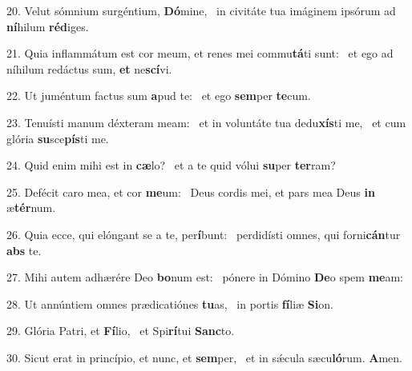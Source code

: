 20. Velut sómnium surgéntium, \textbf{Dó}mine, \ast\  in civitáte tua imáginem ipsórum ad \textbf{ní}hilum \textbf{réd}iges.\

21. Quia inflammátum est cor meum, et renes mei commu\textbf{tá}ti sunt: \ast\  et ego ad níhilum redáctus sum, \textbf{et} ne\textbf{scí}vi.\

22. Ut juméntum factus sum \textbf{a}pud te: \ast\  et ego \textbf{sem}per \textbf{te}cum.\

23. Tenuísti manum déxteram meam: \dag\  et in voluntáte tua dedu\textbf{xís}ti me, \ast\  et cum glória \textbf{su}sce\textbf{pís}ti me.\

24. Quid enim mihi est in \textbf{cæ}lo? \ast\  et a te quid vólui \textbf{su}per \textbf{ter}ram?\

25. Defécit caro mea, et cor \textbf{me}um: \ast\  Deus cordis mei, et pars mea Deus \textbf{in} æ\textbf{tér}num.\

26. Quia ecce, qui elóngant se a te, per\textbf{í}bunt: \ast\  perdidísti omnes, qui forni\textbf{cán}tur \textbf{abs} te.\

27. Mihi autem adhærére Deo \textbf{bo}num est: \ast\  pónere in Dómino \textbf{De}o spem \textbf{me}am:\

28. Ut annúntiem omnes prædicatiónes \textbf{tu}as, \ast\  in portis \textbf{fí}liæ \textbf{Si}on.\

29. Glória Patri, et \textbf{Fí}lio, \ast\  et Spi\textbf{rí}tui \textbf{Sanc}to.\

30. Sicut erat in princípio, et nunc, et \textbf{sem}per, \ast\  et in sǽcula sæcu\textbf{ló}rum. \textbf{A}men.\

